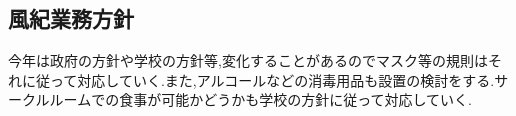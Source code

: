 \subsection*{風紀業務方針}


今年は政府の方針や学校の方針等,変化することがあるのでマスク等の規則はそれに従って対応していく.また,アルコールなどの消毒用品も設置の検討をする.サークルルームでの食事が可能かどうかも学校の方針に従って対応していく.

